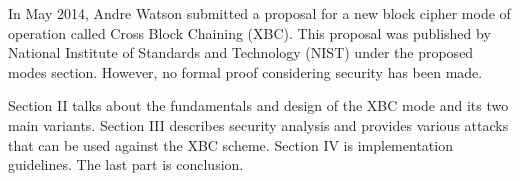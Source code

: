 \documentclass[conference]{IEEEtran}
\begin{document}
In May 2014, Andre Watson submitted a proposal for a new block cipher mode of operation called Cross Block Chaining (XBC). This proposal was published by National Institute of Standards and Technology (NIST) under the proposed modes section. However, no formal proof considering security has been made.

Section II talks about the fundamentals and design of the XBC mode and its two main variants. Section III describes security analysis and provides various attacks that can be used against the XBC scheme. Section IV is implementation guidelines. The last part is conclusion.

%
%



%
%
\end{document}
